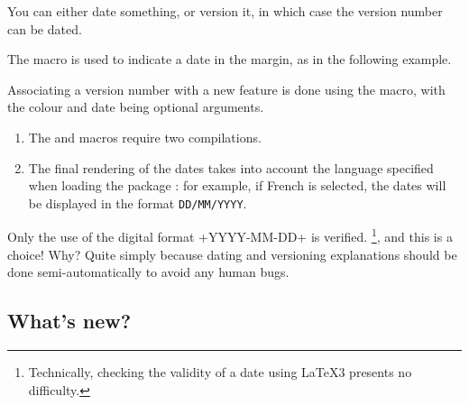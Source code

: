 You can either date something, or version it, in which case the version number can be dated.




\begin{tdocexa}
    The  macro is used to indicate a date in the margin, as in the following example.

\end{tdocexa}




\begin{tdocexa}
    Associating a version number with a new feature is done using the  macro, with the colour and date being optional arguments.

\end{tdocexa}


\begin{tdocimportant}
    \leavevmode

    \begin{enumerate}
        \item The  and  macros require two compilations.

        \item The final rendering of the dates takes into account the language specified when loading the package : for example, if French is selected, the dates will be displayed in the format \texttt{DD/MM/YYYY}.
    \end{enumerate}
\end{tdocimportant}


\begin{tdocwarn}
    Only the use of the digital format \tdocinlatex+YYYY-MM-DD+ is verified.
    \footnote{
        Technically, checking the validity of a date using \LaTeX3 presents no difficulty.
    },
    and this is a choice! Why? Quite simply because dating and versioning explanations should be done semi-automatically to avoid any human bugs.
\end{tdocwarn}


\subsection{What's new?}

